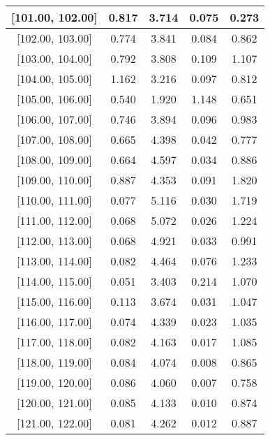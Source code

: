 \documentclass[12pt]{article}
\begin{document}
\begin{table}[]
\begin{tabular}{c|c|c|c|c|}
\multicolumn{1}{|c|}{{[}101.00,  102.00{]}}  & 0.817 & 3.714 & 0.075 & 0.273 \\ \hline 
\multicolumn{1}{|c|}{{[}102.00,  103.00{]}}  & 0.774 & 3.841 & 0.084 & 0.862 \\ \hline 
\multicolumn{1}{|c|}{{[}103.00,  104.00{]}}  & 0.792 & 3.808 & 0.109 & 1.107 \\ \hline 
\multicolumn{1}{|c|}{{[}104.00,  105.00{]}}  & 1.162 & 3.216 & 0.097 & 0.812 \\ \hline 
\multicolumn{1}{|c|}{{[}105.00,  106.00{]}}  & 0.540 & 1.920 & 1.148 & 0.651 \\ \hline 
\multicolumn{1}{|c|}{{[}106.00,  107.00{]}}  & 0.746 & 3.894 & 0.096 & 0.983 \\ \hline 
\multicolumn{1}{|c|}{{[}107.00,  108.00{]}}  & 0.665 & 4.398 & 0.042 & 0.777 \\ \hline 
\multicolumn{1}{|c|}{{[}108.00,  109.00{]}}  & 0.664 & 4.597 & 0.034 & 0.886 \\ \hline 
\multicolumn{1}{|c|}{{[}109.00,  110.00{]}}  & 0.887 & 4.353 & 0.091 & 1.820 \\ \hline 
\multicolumn{1}{|c|}{{[}110.00,  111.00{]}}  & 0.077 & 5.116 & 0.030 & 1.719 \\ \hline 
\multicolumn{1}{|c|}{{[}111.00,  112.00{]}}  & 0.068 & 5.072 & 0.026 & 1.224 \\ \hline 
\multicolumn{1}{|c|}{{[}112.00,  113.00{]}}  & 0.068 & 4.921 & 0.033 & 0.991 \\ \hline 
\multicolumn{1}{|c|}{{[}113.00,  114.00{]}}  & 0.082 & 4.464 & 0.076 & 1.233 \\ \hline 
\multicolumn{1}{|c|}{{[}114.00,  115.00{]}}  & 0.051 & 3.403 & 0.214 & 1.070 \\ \hline 
\multicolumn{1}{|c|}{{[}115.00,  116.00{]}}  & 0.113 & 3.674 & 0.031 & 1.047 \\ \hline 
\multicolumn{1}{|c|}{{[}116.00,  117.00{]}}  & 0.074 & 4.339 & 0.023 & 1.035 \\ \hline 
\multicolumn{1}{|c|}{{[}117.00,  118.00{]}}  & 0.082 & 4.163 & 0.017 & 1.085 \\ \hline 
\multicolumn{1}{|c|}{{[}118.00,  119.00{]}}  & 0.084 & 4.074 & 0.008 & 0.865 \\ \hline 
\multicolumn{1}{|c|}{{[}119.00,  120.00{]}}  & 0.086 & 4.060 & 0.007 & 0.758 \\ \hline 
\multicolumn{1}{|c|}{{[}120.00,  121.00{]}}  & 0.085 & 4.133 & 0.010 & 0.874 \\ \hline 
\multicolumn{1}{|c|}{{[}121.00,  122.00{]}}  & 0.081 & 4.262 & 0.012 & 0.887 \\ \hline 

\end{tabular}
\end{table}
\end{document}
